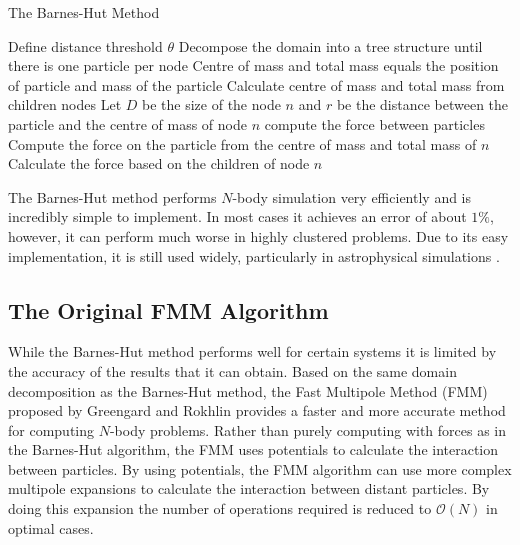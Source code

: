 \begin{algorithm}
\caption{The Barnes-Hut Method}\label{alg:BarnesHut}
\begin{algorithmic}
\State Define distance threshold $\theta$
\State Decompose the domain into a tree structure until there is one particle per node
\State Centre of mass and total mass equals the position of particle and mass of the particle
\Else 
\State Calculate centre of mass and total mass from children nodes
\EndIf
\EndFor
{}
\State Let $D$ be the size of the node $n$ and $r$ be the distance between the particle and the centre of mass of node $n$
\State compute the force between particles 
\Else
{}
\State Compute the force on the particle from the centre of mass and total mass  
\State of $n$
\Else
\State Calculate the force based on the children of node $n$
\EndIf
\EndIf
\EndFor
\end{algorithmic}
\end{algorithm}

The Barnes-Hut method performs $N$-body simulation very efficiently and is incredibly simple to implement. In most cases it achieves an error of about $1\%$, however, it can perform much worse in highly clustered problems. Due to its easy implementation, it is still used widely, particularly in astrophysical simulations \cite{Gaburov2010,Capuzzo-DolcettaIstitutoAstronomico,Ishiyama20124.45Problem,Iwasawa2019ImplementationC,Rein2013Large-scaleRings}.

\FloatBarrier
\subsection{The Original FMM Algorithm}

While the Barnes-Hut method performs well for certain systems it is limited by the accuracy of the results that it can obtain. Based on the same domain decomposition as the Barnes-Hut method, the Fast Multipole Method (FMM) proposed by Greengard and Rokhlin \cite{1988The0-262-7110-X.,Rokhlin1985RapidTheory,Greengard1987ASimulations} provides a faster and more accurate method for computing $N$-body problems. Rather than purely computing with forces as in the Barnes-Hut algorithm, the FMM uses potentials to calculate the interaction between particles. By using potentials, the FMM algorithm can use more complex multipole expansions to calculate the interaction between distant particles. By doing this expansion the number of operations required is reduced to $\mathcal{O}(N)$ in optimal cases.

